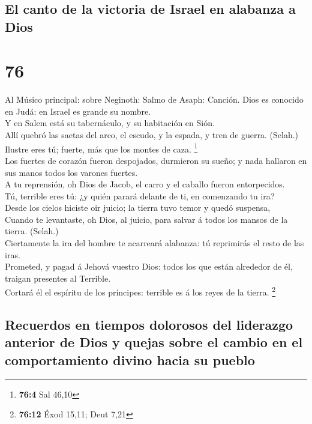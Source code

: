 \hypertarget{el-canto-de-la-victoria-de-israel-en-alabanza-a-dios}{%
\subsection{El canto de la victoria de Israel en alabanza a
Dios}\label{el-canto-de-la-victoria-de-israel-en-alabanza-a-dios}}

\hypertarget{section-75}{%
\section{76}\label{section-75}}

 Al Músico principal: sobre Neginoth: Salmo de Asaph:
Canción. Dios es conocido en Judá: en Israel es grande su nombre.\\
 Y en Salem está su tabernáculo, y su habitación en
Sión.\\
 Allí quebró las saetas del arco, el escudo, y la espada,
y tren de guerra. (Selah.)\\
 Ilustre eres tú; fuerte, más que los montes de caza.
\footnote{\textbf{76:4} Sal 46,10}\\
 Los fuertes de corazón fueron despojados, durmieron su
sueño; y nada hallaron en sus manos todos los varones fuertes.\\
 A tu reprensión, oh Dios de Jacob, el carro y el caballo
fueron entorpecidos.\\
 Tú, terrible eres tú: ¿y quién parará delante de ti, en
comenzando tu ira?\\
 Desde los cielos hiciste oir juicio; la tierra tuvo temor
y quedó suspensa,\\
 Cuando te levantaste, oh Dios, al juicio, para salvar á
todos los mansos de la tierra. (Selah.)\\
 Ciertamente la ira del hombre te acarreará alabanza: tú
reprimirás el resto de las iras.\\
 Prometed, y pagad á Jehová vuestro Dios: todos los que
están alrededor de él, traigan presentes al Terrible.\\
 Cortará él el espíritu de los príncipes: terrible es á
los reyes de la tierra. \footnote{\textbf{76:12} Éxod 15,11; Deut 7,21}

\hypertarget{recuerdos-en-tiempos-dolorosos-del-liderazgo-anterior-de-dios-y-quejas-sobre-el-cambio-en-el-comportamiento-divino-hacia-su-pueblo}{%
\subsection{Recuerdos en tiempos dolorosos del liderazgo anterior de
Dios y quejas sobre el cambio en el comportamiento divino hacia su
pueblo}\label{recuerdos-en-tiempos-dolorosos-del-liderazgo-anterior-de-dios-y-quejas-sobre-el-cambio-en-el-comportamiento-divino-hacia-su-pueblo}}

